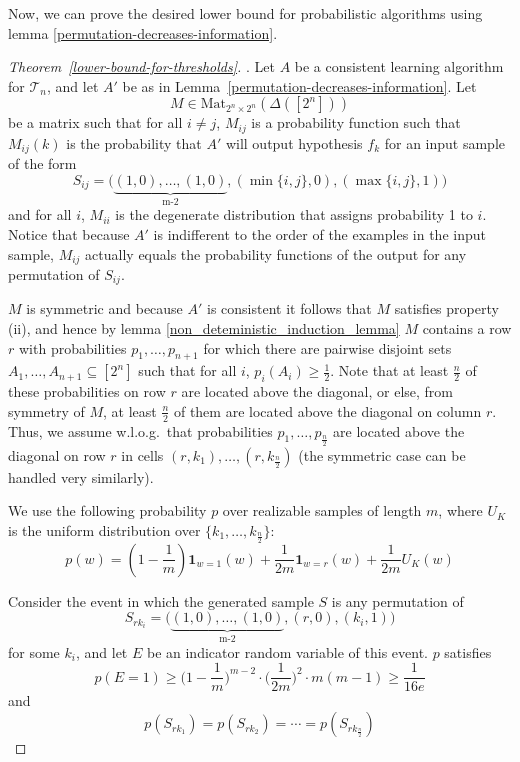 \documentclass[final,12pt]{colt2018}
\newcommand{\mc}[1]{\mathcal{#1}}
\newcommand{\cT}{\mc{T}}
\newcommand{\nin}{\noindent}
\begin{document}
\nin Now, we can prove the desired lower bound for probabilistic algorithms using lemma \ref{permutation-decreases-information}.\\

\begin{proof}[Theorem~\ref{lower-bound-for-thresholds}].
	Let $A$ be a consistent learning algorithm for $\cT_n$, and let $A'$ be as in Lemma~\ref{permutation-decreases-information}. Let
	\[
	M \in \mathrm{Mat}_{2^n\times2^n}(\Delta([2^n]))
	\]
	be a matrix such that for all $i\neq j$, $M_{ij}$ is a probability function such that $M_{ij}(k)$ is the probability that $A'$ will output hypothesis $f_k$ for an input sample of the form
	\[
	S_{ij} = \Big(\underbrace{(1,0), \dots, (1,0)}_{\text{ m-2 }}, (\min\{i,j\},0), (\max\{i,j\},1) \Big)
	\]
	and for all $i$, $M_{ii}$ is the degenerate distribution that assigns probability 1 to $i$. Notice that because $A'$ is indifferent to the order of the examples in the input sample, $M_{ij}$ actually equals the probability functions of the output for any permutation of $S_{ij}$.
	
	$M$ is symmetric and because $A'$ is consistent it follows that $M$ satisfies property (ii), and hence by lemma \ref{non_deteministic_induction_lemma} $M$ contains a row $r$ with probabilities $p_1,\dots,p_{n+1}$ for which there are pairwise disjoint sets $A_1,\dots,A_{n+1} \subseteq [2^n]$ such that for all $i$, $p_i(A_i) \geq \frac{1}{2}$. Note that at least $\frac{n}{2}$ of these probabilities on row $r$ are located above the diagonal, or else, from symmetry of $M$, at least $\frac{n}{2}$ of them are located above the diagonal on column $r$. Thus, we assume w.l.o.g.\ that probabilities $p_1,\dots,p_\frac{n}{2}$ are located above the diagonal on row $r$ in cells $(r,k_1),\dots,(r,k_{\frac{n}{2}})$ (the symmetric case can be handled very similarly).
	
	We use the following probability $p$ over realizable samples of length $m$, where $U_K$ is the uniform distribution over $\{k_1,\dots,k_{\frac{n}{2}}\}$:
	\[
	p(w) = \left(1-\frac{1}{m}\right)\textbf{1}_{w=1}(w) + \frac{1}{2m}\textbf{1}_{w=r}(w) + \frac{1}{2m} U_K(w)
	\]
	
	\nin Consider the event in which the generated sample $S$ is any permutation of
	\[
	S_{rk_i} = \Big(\underbrace{(1,0), \dots, (1,0)}_{\text{ m-2 }}, (r,0), (k_i,1) \Big)
	\]
	for some $k_i$, and let $E$ be an indicator random variable of this event. $p$ satisfies
	\[
	p(E=1) \geq \Big(1-\frac{1}{m}\Big)^{m-2}\cdot \Big(\frac{1}{2m}\Big)^2\cdot m(m-1) \geq \frac{1}{16e}
	\]
	and
	\[
	p(S_{rk_1})=p(S_{rk_2})=\cdots=p(S_{rk_{\frac{n}{2}}})
	\]
	

\end{proof}
\end{document}
